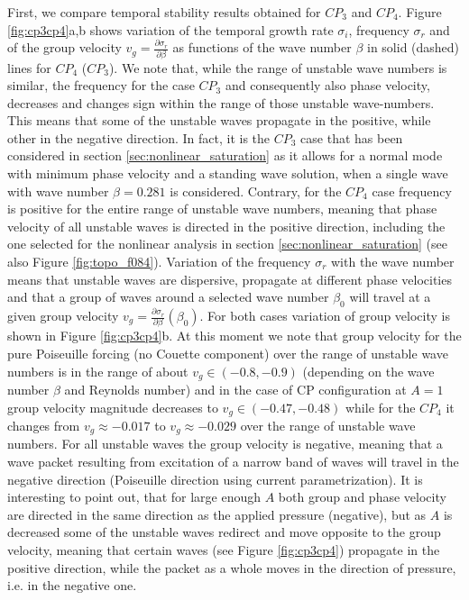 \documentclass[lineno]{jfm}
\begin{document}
{First, we compare temporal stability results obtained for $CP_3$ and $CP_4$.
Figure \ref{fig:cp3cp4}a,b shows variation of the temporal growth rate $\sigma_i$, frequency $\sigma_r$ and of the group velocity $v_g=\frac{\partial \sigma_r}{\partial \beta}$ as functions of the wave number $\beta$ in solid (dashed) lines for $CP_4$ ($CP_3$).
We note that, while the range of unstable wave numbers is similar, the frequency for the case $CP_3$ and consequently also phase velocity, decreases and changes sign within the range of those unstable wave-numbers.
This means that some of the unstable waves propagate in the positive, while other in the negative direction. In fact, it is the $CP_3$ case that has been considered in section \ref{sec:nonlinear_saturation} as it allows for a normal mode with minimum phase velocity and a standing wave solution, when a single wave with wave number $\beta=0.281$ is considered.
Contrary, for the $CP_4$ case frequency is positive for the entire range of unstable wave numbers, meaning that phase velocity of all unstable waves is directed in the positive direction, including the one selected for the nonlinear analysis in section \ref{sec:nonlinear_saturation} (see also Figure \ref{fig:topo_f084}).
Variation of the frequency $\sigma_r$ with the wave number means that unstable waves are dispersive, propagate at different phase velocities and that a group of waves around a selected wave number $\beta_0$ will travel at a given group velocity
$v_g = \frac{\partial \sigma_r}{\partial \beta}(\beta_0)$.
For both cases variation of group velocity is shown in Figure \ref{fig:cp3cp4}b.
At this moment we note that group velocity for the pure Poiseuille forcing (no Couette component) over the range of unstable wave numbers is in the range of about $v_g\in(-0.8,-0.9)$ (depending on the wave number $\beta$ and Reynolds number) and in the case of CP configuration at $A=1$ group velocity magnitude decreases to $v_g\in(-0.47,-0.48)$ while for the $CP_4$ it changes from $v_g\approx-0.017$ to $v_g\approx-0.029$ over the range of unstable wave numbers. 
For all unstable waves the group velocity is negative, meaning that a wave packet resulting from excitation of a narrow band of waves will travel in the negative direction (Poiseuille direction using current parametrization).
It is interesting to point out, that for large enough $A$ both group and phase velocity are directed in the same direction as the applied pressure (negative), but as $A$ is decreased some of the unstable waves redirect and move opposite to the group velocity, meaning that certain waves (see Figure \ref{fig:cp3cp4}) propagate in the positive direction, while the packet as a whole moves in the direction of pressure, i.e. in the negative one.

}
\end{document}
